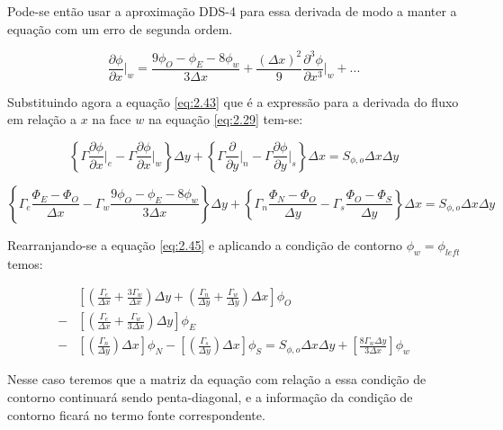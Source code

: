 Pode-se então usar a aproximação DDS-4 para essa derivada de modo a manter a equação com um erro de segunda ordem.

\begin{equation}
    \label{eq:2.43}
    \frac{\partial \phi}{\partial x} \bigg|_w = \frac{9 \phi_O - \phi_{E} -8\phi_w}{3 \Delta x} + \frac{(\Delta x)^2}{9} \frac{\partial^3 \phi}{\partial x^3} \bigg|_w + ...
\end{equation}

Substituindo agora a equação \ref{eq:2.43} que é a expressão para a derivada do fluxo em relação a $x$ na face $w$ na equação \ref{eq:2.29} tem-se:

\begin{equation}
    \label{eq:2.44}
    \left\{ \Gamma \frac{\partial \phi}{\partial x}\bigg|_e -\Gamma \frac{\partial \phi}{\partial x}\bigg|_w  \right\} \Delta y + \left\{\Gamma \frac{\partial}{\partial y}\bigg|_n - \Gamma \frac{\partial \phi}{\partial y}\bigg|_s  \right\} \Delta x = S_{\phi,o}\Delta x \Delta y
\end{equation}

\begin{equation}
    \label{eq:2.45}
    \left\{\Gamma_e \frac{\Phi_E-\Phi_O}{\Delta x} - \Gamma_w \frac{9 \phi_O - \phi_{E} -8\phi_w}{3 \Delta x} \right\} \Delta y + \left\{\Gamma_n \frac{\Phi_N-\Phi_O}{\Delta y} - \Gamma_s \frac{\Phi_O-\Phi_S}{\Delta y}  \right\} \Delta x = S_{\phi,o}\Delta x \Delta y
\end{equation}

Rearranjando-se a equação \ref{eq:2.45} e aplicando a condição de contorno $\phi_w = \phi_{left}$ temos:

\begin{equation}
\begin{split}
    &\left[\left( \frac{\Gamma_e}{\Delta x}+\frac{3\Gamma_w}{\Delta x}\right)\Delta y  + \left(\frac{\Gamma_n}{\Delta y}+\frac{\Gamma_w}{\Delta y}\right)\Delta x  \right]\phi_O\\
    - &\left[\left(\frac{\Gamma_e}{\Delta x}+\frac{\Gamma_w}{3\Delta x}\right)\Delta y\right]\phi_E\\
    - & \left[\left(\frac{\Gamma_n}{\Delta y}\right)\Delta x\right]\phi_N-\left[\left(\frac{\Gamma_s}{\Delta y}\right)\Delta x\right]\phi_S = S_{\phi,o}\Delta x \Delta y + \left[\frac{8\Gamma_w \Delta y}{3 \Delta x}\right]\phi_w
\end{split}
\end{equation}

Nesse caso teremos que a matriz da equação com relação a essa condição de contorno continuará sendo penta-diagonal, e a informação da condição de contorno ficará no termo fonte correspondente.

